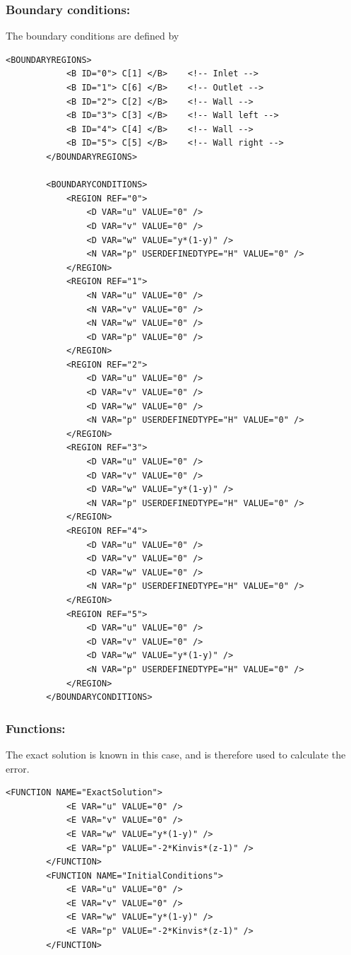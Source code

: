 \subsubsection{Boundary conditions:~} The boundary conditions are defined by
\begin{lstlisting}[style=XMLStyle]
        <BOUNDARYREGIONS>
            <B ID="0"> C[1] </B>    <!-- Inlet -->
            <B ID="1"> C[6] </B>    <!-- Outlet -->
            <B ID="2"> C[2] </B>    <!-- Wall -->
            <B ID="3"> C[3] </B>    <!-- Wall left -->
            <B ID="4"> C[4] </B>    <!-- Wall -->
            <B ID="5"> C[5] </B>    <!-- Wall right -->
        </BOUNDARYREGIONS>

        <BOUNDARYCONDITIONS>
            <REGION REF="0">
                <D VAR="u" VALUE="0" />
                <D VAR="v" VALUE="0" />
                <D VAR="w" VALUE="y*(1-y)" />
                <N VAR="p" USERDEFINEDTYPE="H" VALUE="0" />
            </REGION>
            <REGION REF="1">
                <N VAR="u" VALUE="0" />
                <N VAR="v" VALUE="0" />
                <N VAR="w" VALUE="0" />
                <D VAR="p" VALUE="0" />
            </REGION>
            <REGION REF="2">
                <D VAR="u" VALUE="0" />
                <D VAR="v" VALUE="0" />
                <D VAR="w" VALUE="0" />
                <N VAR="p" USERDEFINEDTYPE="H" VALUE="0" />
            </REGION>
            <REGION REF="3">
                <D VAR="u" VALUE="0" />
                <D VAR="v" VALUE="0" />
                <D VAR="w" VALUE="y*(1-y)" />
                <N VAR="p" USERDEFINEDTYPE="H" VALUE="0" />
            </REGION>
            <REGION REF="4">
                <D VAR="u" VALUE="0" />
                <D VAR="v" VALUE="0" />
                <D VAR="w" VALUE="0" />
                <N VAR="p" USERDEFINEDTYPE="H" VALUE="0" />
            </REGION>
            <REGION REF="5">
                <D VAR="u" VALUE="0" />
                <D VAR="v" VALUE="0" />
                <D VAR="w" VALUE="y*(1-y)" />
                <N VAR="p" USERDEFINEDTYPE="H" VALUE="0" />
            </REGION>
        </BOUNDARYCONDITIONS>
\end{lstlisting}

\subsubsection{Functions:~} The exact solution is known in this case, and is therefore used to calculate the error.
\begin{lstlisting}[style=XMLStyle]
        <FUNCTION NAME="ExactSolution">
            <E VAR="u" VALUE="0" />
            <E VAR="v" VALUE="0" />
            <E VAR="w" VALUE="y*(1-y)" />
            <E VAR="p" VALUE="-2*Kinvis*(z-1)" />
        </FUNCTION>
        <FUNCTION NAME="InitialConditions">
            <E VAR="u" VALUE="0" />
            <E VAR="v" VALUE="0" />
            <E VAR="w" VALUE="y*(1-y)" />
            <E VAR="p" VALUE="-2*Kinvis*(z-1)" />
        </FUNCTION>
\end{lstlisting}

